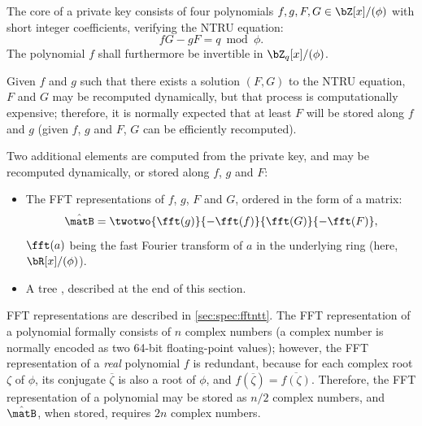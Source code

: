 The core of a \falcon private key \sk consists of four polynomials
$f,g,F,G \in \bZ[x]/(\phi)$ with short integer coefficients, verifying the
NTRU equation:
 \begin{equation}\label{eq:ntru}
  fG -gF = q \bmod \phi.
 \end{equation}
The polynomial $f$ shall furthermore be invertible in $\bZ_q[x]/(\phi)$.

Given $f$ and $g$ such that there exists a solution $(F,G)$ to the NTRU
equation, $F$ and $G$ may be recomputed dynamically, but that process is
computationally expensive; therefore, it is normally expected that at
least $F$ will be stored along $f$ and $g$ (given $f$, $g$ and $F$, $G$
can be efficiently recomputed).

Two additional elements are computed from the private key, and may be
recomputed dynamically, or stored along $f$, $g$ and $F$:
\begin{itemize}
 \item The FFT representations of $f$, $g$, $F$ and $G$, ordered in the
 form of a matrix:
 \begin{equation}\label{eq:hatb}
 \hat \matB = \twotwo{\fft(g)}{-\fft(f)}{\fft(G)}{-\fft(F)},
 \end{equation}
 $\fft(a)$ being the fast Fourier transform of $a$ in the
 underlying ring (here, $\bR[x]/(\phi)$).
 \item A \falcon tree \tree, described at the end of this section.
\end{itemize}

FFT representations are described in \cref{sec:spec:fftntt}. The
FFT representation of a polynomial formally consists of $n$ complex
numbers (a complex number is normally encoded as two 64-bit
floating-point values); however, the FFT representation of a \emph{real}
polynomial $f$ is redundant, because for each complex root $\zeta$ of
$\phi$, its conjugate $\overline{\zeta}$ is also a root of $\phi$, and
$f(\overline{\zeta}) = \overline{f(\zeta)}$. Therefore, the FFT
representation of a polynomial may be stored as $n/2$ complex numbers,
and $\hat \matB$, when stored, requires $2n$ complex numbers.

